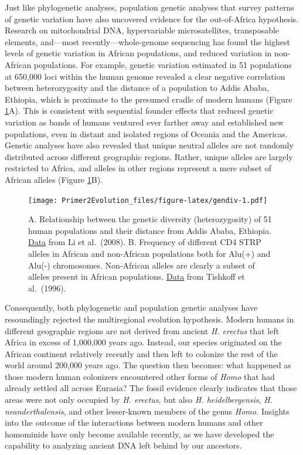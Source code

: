 \documentclass[
]{book}
\begin{document}
Just like phylogenetic analyses, population genetic analyses that survey patterns of genetic variation have also uncovered evidence for the out-of-Africa hypothesis. Research on mitochondrial DNA, hypervariable microsatellites, transposable elements, and---most recently---whole-genome sequencing has found the highest levels of genetic variation in African populations, and reduced variation in non-African populations. For example, genetic variation estimated in 51 populations at 650,000 loci within the human genome revealed a clear negative correlation between heterozygosity and the distance of a population to Addis Ababa, Ethiopia, which is proximate to the presumed cradle of modern humans (Figure \ref{fig:gendiv}A). This is consistent with sequential founder effects that reduced genetic variation as bands of humans ventured ever farther away and established new populations, even in distant and isolated regions of Oceania and the Americas. Genetic analyses have also revealed that unique neutral alleles are not randomly distributed across different geographic regions. Rather, unique alleles are largely restricted to Africa, and alleles in other regions represent a mere subset of African alleles (Figure \ref{fig:gendiv}B).

\begin{figure}
\centering
\texttt{[image: Primer2Evolution\_files/figure-latex/gendiv-1.pdf]}
\caption{\label{fig:gendiv}A. Relationship between the genetic diversity (heterozygosity) of 51 human populations and their distance from Addis Ababa, Ethiopia. \href{data/14_humanheterozygosity.csv}{Data} from Li et al.~(2008). B. Frequency of different CD4 STRP alleles in African and non-African populations both for Alu(+) and Alu(-) chromosomes. Non-African alleles are clearly a subset of alleles present in African populations. \href{data/14_subsets.csv}{Data} from Tishkoff et al.~(1996).}
\end{figure}

Consequently, both phylogenetic and population genetic analyses have resoundingly rejected the multiregional evolution hypothesis. Modern humans in different geographic regions are not derived from ancient \emph{H. erectus} that left Africa in excess of 1,000,000 years ago. Instead, our species originated on the African continent relatively recently and then left to colonize the rest of the world around 200,000 years ago. The question then becomes: what happened as those modern human colonizers encountered other forms of \emph{Homo} that had already settled all across Eurasia? The fossil evidence clearly indicates that those areas were not only occupied by \emph{H. erectus}, but also \emph{H. heidelbergensis}, \emph{H. neanderthalensis}, and other lesser-known members of the genus \emph{Homo.} Insights into the outcome of the interactions between modern humans and other homominids have only become available recently, as we have developed the capability to analyzing ancient DNA left behind by our ancestors.
\end{document}
